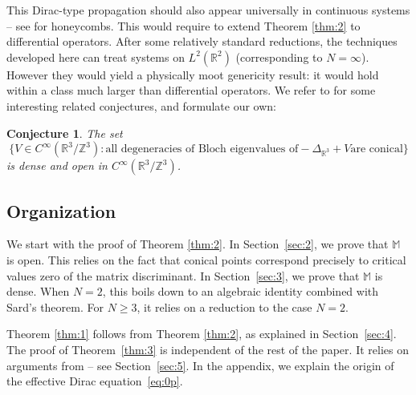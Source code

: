 \documentclass[JEP,XML,SOM,Unicode,NoFloatCountersInSection]{cedram}
\let\sep:
\newtheorem{conj}{Conjecture}
\theoremstyle{definition}
\newcommand{\R}{\mathbb{R}}
\newcommand{\Mm}{\mathbb{M}}
\newcommand{\Z}{\mathbb{Z}}
\begin{document}
This Dirac-type propagation should also appear universally in continuous systems -- see \eg \cite{RH08,FLW16,D19a,DW19} for honeycombs. This would require to extend Theorem \ref{thm:2} to differential operators. After some relatively standard reductions, the techniques developed here can treat systems on $L^2(\R^2)$ (corresponding to $N = \infty$). However they would yield a physically moot genericity result: it would hold within a class much larger than differential operators. We refer to \cite{C91,K16} for some interesting related conjectures, and formulate our own:

\begin{conj} The set
\begin{equation*}
\bigl\{ V \in C^\infty(\R^3/\Z^3) \sep \text{all degeneracies of Bloch eigenvalues of} -\Delta_{\R^3}+V \text{are conical}\bigr\}
\end{equation*}
is dense and open in $C^\infty(\R^3/\Z^3)$.
\end{conj}

\subsection{Organization} We start with the proof of Theorem \ref{thm:2}. In Section~\ref{sec:2}, we prove that $\Mm$ is open. This relies on the fact that conical points correspond precisely to critical values zero of the matrix discriminant.
In Section~\ref{sec:3}, we prove that $\Mm$ is dense. When $N=2$, this boils down to an algebraic identity combined with Sard's theorem. For $N \geq 3$, it relies on a reduction to the case $N=2$.

Theorem \ref{thm:1} follows from Theorem \ref{thm:2}, as explained in Section~\ref{sec:4}. The proof of Theorem~\ref{thm:3} is independent of the rest of the paper. It relies on arguments from \cite{D19b} -- see Section~\ref{sec:5}. In the appendix, we explain the origin of the effective Dirac equation~\eqref{eq:0p}.
\end{document}
